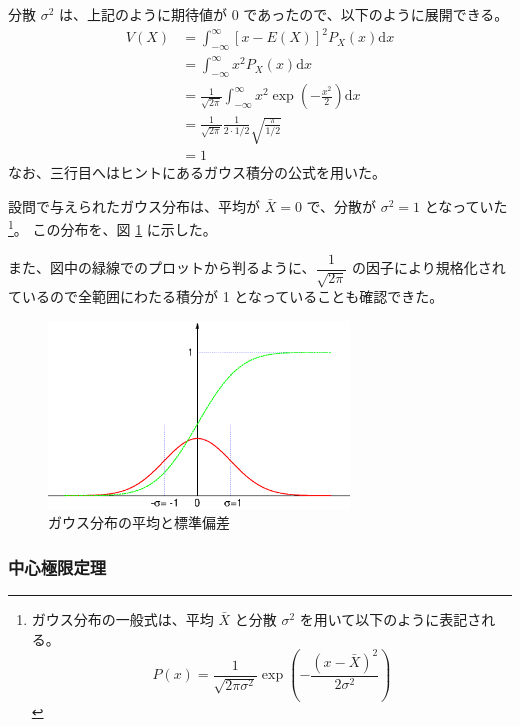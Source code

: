 \documentclass[uplatex,dvipdfmx,a4paper,11pt]{jsarticle}
\newcommand{\diff}{\mathrm d}
\begin{document}
\begin{enumerate}
分散 $\sigma^2$ は、上記のように期待値が 0 であったので、以下のように展開できる。
\begin{align*}
V(X) 
	&= \int_{-\infty}^{\infty} [x -E(X)]^2 P_X(x) \diff x \\
	&= \int_{-\infty}^{\infty} x^2 P_X(x) \diff x \\
	&= \frac{1}{\sqrt{2 \pi}} \int_{-\infty}^{\infty} x^2 \exp \left(- \frac{x^2}{2} \right) \diff x \\
	&= \frac{1}{\sqrt{2 \pi}} \frac{1}{2\cdot 1/2} \sqrt{\frac{\pi}{1/2}} \\
	&=1
\end{align*}
なお、三行目へはヒントにあるガウス積分の公式を用いた。

設問で与えられたガウス分布は、平均が $\bar{X} = 0$ で、分散が $\sigma^2 = 1$ となっていた
\footnote
{
ガウス分布の一般式は、平均 $\bar{X}$ と分散 $\sigma^2$ を用いて以下のように表記される。
\begin{equation*}
P(x) = \dfrac{1}{\sqrt{2 \pi \sigma^2}} \exp \left(-\dfrac{(x-\bar{X})^2}{2 \sigma^2} \right)
\end{equation*}
}。
この分布を、図 \ref{fig:gauss_dist} に示した。

また、図中の緑線でのプロットから判るように、$\dfrac{1}{\sqrt{2 \pi}} $ の因子により規格化されているので全範囲にわたる積分が 1 となっていることも確認できた。

\begin{figure}[htp]
\centering
	\includegraphics[width=8cm]{./figures/gauss_dist.eps}
	\caption{ガウス分布の平均と標準偏差}
	\label{fig:gauss_dist}
\end{figure}

\end{enumerate}

\newpage





\subsubsection{中心極限定理}
\end{document}
